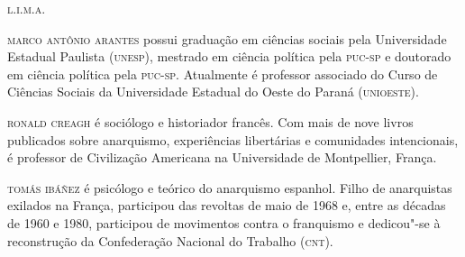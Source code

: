 \bigskip
\noindent\textsc{l.i.m.a.}

\bigskip
\noindent\textsc{marco antônio arantes} possui graduação em ciências sociais pela Universidade Estadual Paulista (\textsc{unesp}), mestrado em ciência política pela \textsc{puc-sp} e doutorado em ciência política pela \textsc{puc-sp}.
Atualmente é professor associado do Curso de Ciências Sociais da Universidade Estadual do Oeste do Paraná (\textsc{unioeste}).

\bigskip
\noindent\textsc{ronald creagh} é sociólogo e historiador francês. Com mais de nove livros publicados sobre anarquismo, experiências libertárias e comunidades intencionais, é professor de Civilização Americana na Universidade de Montpellier, França.

\bigskip
\noindent\textsc{tomás ibáñez} é psicólogo e teórico do anarquismo espanhol. Filho de anarquistas exilados na França, participou das revoltas de maio de 1968 e, entre as décadas de 1960 e 1980, participou de movimentos contra o franquismo e dedicou"-se à reconstrução da Confederação Nacional do Trabalho (\textsc{cnt}).